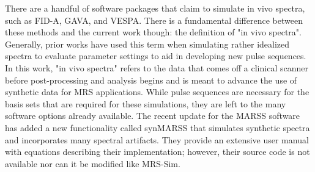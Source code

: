 There are a handful of software packages that claim to simulate in vivo spectra, such as FID-A\cite{Simpson2017}, GAVA\cite{Soher2007}, and VESPA\cite{Soher2023}. There is a fundamental difference between these methods and the current work though: the definition of "in vivo spectra". Generally, prior works have used this term when simulating rather idealized spectra to evaluate parameter settings to aid in developing new pulse sequences. In this work, "in vivo spectra" refers to the data that comes off a clinical scanner before post-processing and analysis begins and is meant to advance the use of synthetic data for MRS applications. While pulse sequences are necessary for the basis sets that are required for these simulations, they are left to the many software options already available. The recent update for the MARSS\cite{Landheer2021} software has added a new functionality called synMARSS that simulates synthetic spectra and incorporates many spectral artifacts. They provide an extensive user manual with equations describing their implementation; however, their source code is not available nor can it be modified like MRS-Sim.




